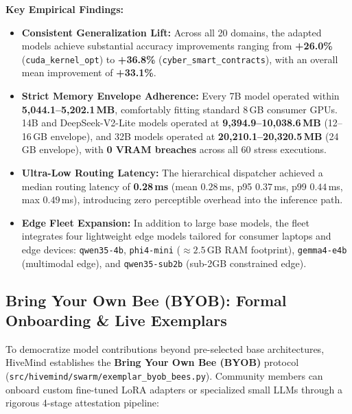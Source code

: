 \documentclass[11pt,a4paper]{article}
\begin{document}
\textbf{Key Empirical Findings:}
\begin{itemize}[leftmargin=1.8em]
    \item \textbf{Consistent Generalization Lift:} Across all 20 domains, the adapted models achieve substantial accuracy improvements ranging from \textbf{+26.0\%} (\texttt{cuda\_kernel\_opt}) to \textbf{+36.8\%} (\texttt{cyber\_smart\_contracts}), with an overall mean improvement of \textbf{+33.1\%}.
    \item \textbf{Strict Memory Envelope Adherence:} Every 7B model operated within \textbf{5{,}044.1--5{,}202.1\,MB}, comfortably fitting standard 8\,GB consumer GPUs. 14B and DeepSeek-V2-Lite models operated at \textbf{9{,}394.9--10{,}038.6\,MB} (12--16\,GB envelope), and 32B models operated at \textbf{20{,}210.1--20{,}320.5\,MB} (24\,GB envelope), with \textbf{0 VRAM breaches} across all 60 stress executions.
    \item \textbf{Ultra-Low Routing Latency:} The hierarchical dispatcher achieved a median routing latency of \textbf{0.28\,ms} (mean $0.28$\,ms, p95 $0.37$\,ms, p99 $0.44$\,ms, max $0.49$\,ms), introducing zero perceptible overhead into the inference path.
    \item \textbf{Edge Fleet Expansion:} In addition to large base models, the fleet integrates four lightweight edge models tailored for consumer laptops and edge devices: \texttt{qwen35-4b}, \texttt{phi4-mini} ($\approx 2.5$\,GB RAM footprint), \texttt{gemma4-e4b} (multimodal edge), and \texttt{qwen35-sub2b} (sub-2GB constrained edge).
\end{itemize}

\subsection{Bring Your Own Bee (BYOB): Formal Onboarding \& Live Exemplars}
\label{sec:byob_lifecycle}

To democratize model contributions beyond pre-selected base architectures, HiveMind establishes the \textbf{Bring Your Own Bee (BYOB)} protocol (\texttt{src/\allowbreak hivemind/\allowbreak swarm/\allowbreak exemplar\_byob\_bees.py}). Community members can onboard custom fine-tuned LoRA adapters or specialized small LLMs through a rigorous 4-stage attestation pipeline:
\end{document}
